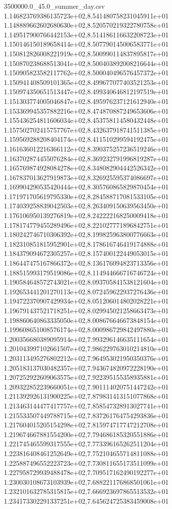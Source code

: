 \begin{filecontents*}{3500000.0_45.0_summer_day.csv}
1.146823769386135723e+02,8.541480758231045911e+01
1.148889662602680630e+02,8.520570219322780758e+01
1.149517900766442153e+02,8.514186116632208723e+01
1.150146150189658414e+02,8.507790145006583771e+01
1.150812826008221919e+02,8.500990114837895817e+01
1.150870238688513041e+02,8.500403892008216644e+01
1.150905823582117762e+02,8.500040496576457372e+01
1.150941408509101365e+02,8.499677077403521253e+01
1.150974350651513447e+02,8.499340646812197519e+01
1.151303774005046847e+02,8.495976237121612940e+01
1.153369945357882216e+02,8.474870887249653606e+01
1.155436254811606034e+02,8.453758114580432448e+01
1.157502702415757767e+02,8.432637918741511385e+01
1.159569288208404174e+02,8.411510299594192475e+01
1.161636012216366112e+02,8.390375257236519246e+01
1.163702874455076284e+02,8.369232791996819287e+01
1.165769874928084278e+02,8.348082904442526342e+01
1.167837013627919873e+02,8.326925595374086697e+01
1.169904290535420444e+02,8.305760865829870454e+01
1.171971705619795330e+02,8.284588717081533105e+01
1.174039258839042503e+02,8.263409150639563450e+01
1.176106950139276819e+02,8.242222168250009418e+01
1.178174779455289496e+02,8.221027771896842751e+01
1.180242746710306392e+02,8.199825963800776663e+01
1.182310851815952901e+02,8.178616746419174888e+01
1.184379094672305257e+02,8.157400122449053015e+01
1.186447475167866372e+02,8.136176094823713356e+01
1.188515993179519086e+02,8.114944666716746724e+01
1.190584648572743021e+02,8.093705841538121604e+01
1.192653441201270113e+02,8.072459622937276436e+01
1.194722370907429934e+02,8.051206014802028221e+01
1.196791437521718251e+02,8.029945021258663473e+01
1.198860640863335050e+02,8.008676646673848154e+01
1.199608651008576174e+02,8.000986729842497880e+01
1.200356680389095914e+02,7.993296146635111654e+01
1.201043997102661507e+02,7.986229763010214810e+01
1.203113495276802212e+02,7.964953021950350376e+01
1.205183137030482357e+02,7.943674820972228190e+01
1.207252922609063575e+02,7.922395155358935881e+01
1.209322852239660051e+02,7.901114020751447242e+01
1.211392926131900225e+02,7.879831413151077868e+01
1.213463144477417757e+02,7.858547328913027741e+01
1.215533507449788715e+02,7.837261764754293836e+01
1.217604015205154298e+02,7.815974717747212708e+01
1.219674667881554200e+02,7.794686185320551886e+01
1.221745465599317555e+02,7.773396165262511204e+01
1.223816408461252649e+02,7.752104655714811088e+01
1.225887496552223723e+02,7.730811655173511099e+01
1.227958729939488478e+02,7.709517162490192277e+01
1.230030108673103939e+02,7.688221176868501061e+01
1.232101632785315815e+02,7.666923697865513532e+01
1.234173302291337251e+02,7.645624725383459008e+01

\end{filecontents*}

